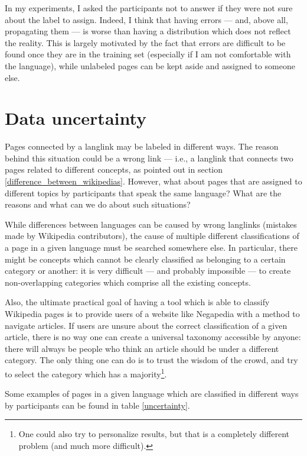         In my experiments, I asked the participants not to answer if they were not sure about the label to assign. Indeed, I think that having errors --- and, above all, propagating them --- is worse than having a distribution which does not reflect the reality. This is largely motivated by the fact that errors are difficult to be found once they are in the training set (especially if I am not comfortable with the language), while unlabeled pages can be kept aside and assigned to someone else.
    \section{Data uncertainty}\label{sec_uncertainty}
        Pages connected by a langlink may be labeled in different ways. The reason behind this situation could be a wrong link --- i.e., a langlink that connects two pages related to different concepts, as pointed out in section \ref{difference_between_wikipedias}. However, what about pages that are assigned to different topics by participants that speak the same language? What are the reasons and what can we do about such situations?
        
        While differences between languages can be caused by wrong langlinks (mistakes made by Wikipedia contributors), the cause of multiple different classifications of a page in a given language must be searched somewhere else. In particular, there might be concepts which cannot be clearly classified as belonging to a certain category or another: it is very difficult --- and probably impossible --- to create non-overlapping categories which comprise all the existing concepts.
        
        Also, the ultimate practical goal of having a tool which is able to classify Wikipedia pages is to provide users of a website like Negapedia with a method to navigate articles. If users are unsure about the correct classification of a given article, there is no way one can create a universal taxonomy accessible by anyone: there will always be people who think an article should be under a different category. The only thing one can do is to trust the wisdom of the crowd, and try to select the category which has a majority\footnote{One could also try to personalize results, but that is a completely different problem (and much more difficult).}.
        
        Some examples of pages in a given language which are classified in different ways by participants can be found in table \ref{uncertainty}.
        

